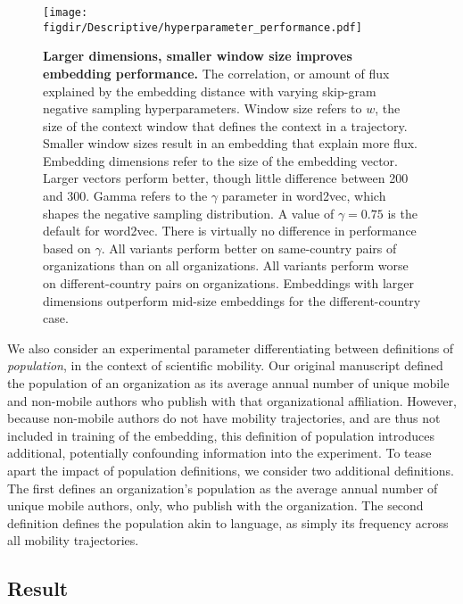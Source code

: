 \documentclass[12pt,a4paper]{article}
\def\figdir{../Figs}
\begin{document}
%
%
\begin{figure}[ht!]
	\centering
	\texttt{[image: \\figdir/Descriptive/hyperparameter\_performance.pdf]}
	\caption{
		\textbf{Larger dimensions, smaller window size improves embedding performance.}
		The correlation, or amount of flux explained by the embedding distance with varying skip-gram negative sampling hyperparameters.
		Window size refers to $w$, the size of the context window that defines the context in a trajectory.
		Smaller window sizes result in an embedding that explain more flux.
		Embedding dimensions refer to the size of the embedding vector.
		Larger vectors perform better, though little difference between 200 and 300.
		Gamma refers to the $\gamma$ parameter in word2vec, which shapes the negative sampling distribution.
		A value of $\gamma = 0.75$ is the default for word2vec.
		There is virtually no difference in performance based on $\gamma$.
		All variants perform better on same-country pairs of organizations than on all organizations.
		All variants perform worse on different-country pairs on organizations.
		Embeddings with larger dimensions outperform mid-size embeddings for the different-country case.
	}

	\label{fig:supp:hyperparameter}
\end{figure}

We also consider an experimental parameter differentiating between definitions of \textit{population}, in the context of scientific mobility.
Our original manuscript defined the population of an organization as its average annual number of unique mobile and non-mobile authors who publish with that organizational affiliation.
However, because non-mobile authors do not have mobility trajectories, and are thus not included in training of the embedding, this definition of population introduces additional, potentially confounding information into the experiment.
To tease apart the impact of population definitions, we consider two additional definitions.
The first defines an organization's population as the average annual number of unique mobile authors, only, who publish with the organization.
The second definition defines the population akin to language, as simply its frequency across all mobility trajectories.

\subsection{Result}
\end{document}
